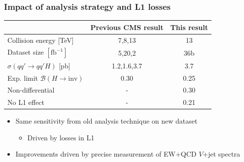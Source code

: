 \documentclass[aspectratio=169,xcolor=dvipsnames,,table,compress]{beamer}
\begin{document}
\begin{frame}[t] \frametitle{Impact of analysis strategy and L1 losses}
  \centering 
  \vspace{7mm}
  \begin{tabular}{l|c|c} 
    & Previous CMS result & This result \\ 
    \hline \hline 
    Collision energy [TeV] & 7,8,13 & 13  \\ 
    Dataset size $[\mathrm{fb}^{-1}]$ & 5,20,2 & 36b\\ 
    $\sigma(qq'\rightarrow qq'H)$ [pb] & 1.2,1.6,3.7 & 3.7  \\ 
    \hline
    Exp. limit $\mathcal{B}(H\rightarrow\mathrm{inv})$ & 0.30 & 0.25  \\ 
    \hline 
    Non-differential & - & 0.30 \\ 
    No L1 effect & - & 0.21 \\
  \end{tabular}
  \vspace{3mm}
  \begin{itemize}
    \item Same sensitivity from old analysis technique on new dataset 
      \begin{itemize}
        \item Driven by losses in L1 
      \end{itemize}
    \item Improvements driven by precise measurement of EW+QCD $V$+jet spectra
  \end{itemize}
\end{frame}
\end{document}
